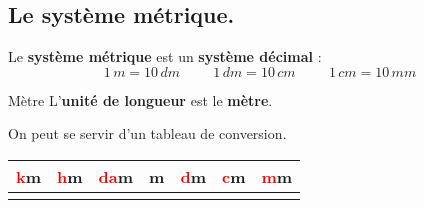 \begin{pageCours} 


\section{Le système métrique.}


\begin{Def}
Le \textbf{système métrique} est un \textbf{système décimal} :\\
\[1\, m=10\, dm \hspace{1cm} 1\, dm=10\, cm \hspace{1cm}1\, cm=10\, mm\]
\end{Def}



\begin{DefT}{Mètre}
L'\textbf{unité de longueur} est le \textbf{mètre}.
\end{DefT}



\begin{Mt}
On peut se servir d'un tableau de conversion.
\begin{center}
\begin{tabular}{|c|c|c|c|c|c|c|}\hline
    \textcolor{red}{k}m & \textcolor{red}{h}m & \textcolor{red}{da}m & m & \textcolor{red}{d}m & \textcolor{red}{c}m & \textcolor{red}{m}m \\ \hline
 &&&&&&  \\ \hline
\end{tabular}
\end{center}
\end{Mt}


\end{pageCours}
